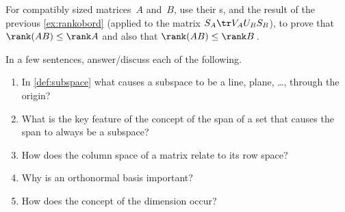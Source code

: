 \begin{exercise}  
For compatibly sized matrices~\(A\) and~\(B\), use their \svd{}s, and the result of the previous \cref{ex:rankobord} (applied to the matrix \(S_A\tr V_AU_BS_B\)), to prove that \(\rank(AB)\leq\rank A\) and also that \(\rank(AB)\leq\rank B\)\,.
\end{exercise}




\begin{exercise}  
In a few sentences, answer\slash discuss each of the following.
\begin{enumerate}
\item In \cref{def:subspace} what causes a subspace to be a line, plane, \ldots, through the origin?

\item What is the key feature of the concept of the span of a set that causes the span to always be a subspace?

\item How does the column space of a matrix relate to its row space?

\item Why is an orthonormal basis important?

\item How does the concept of the dimension occur?

\end{enumerate}
\end{exercise}

